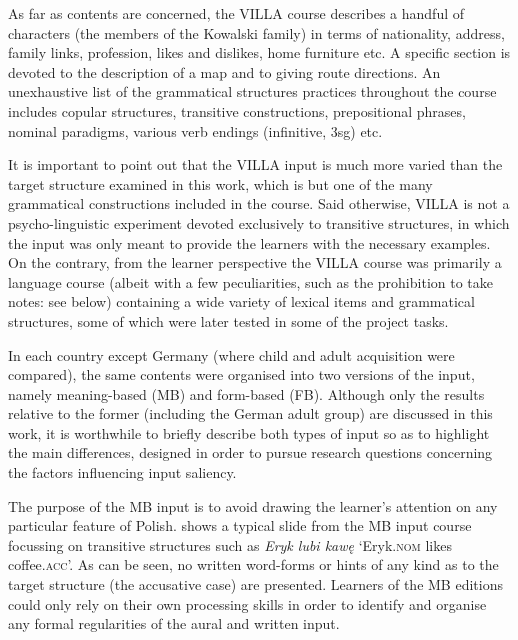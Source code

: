 As far as contents are concerned, the VILLA course describes a handful of characters (the members of the Kowalski family) in terms of nationality, address, family links, profession, likes and dislikes, home furniture etc. A specific section is devoted to the description of a map and to giving route directions. An unexhaustive list of the grammatical structures practices throughout the course includes copular structures, transitive constructions, prepositional phrases, nominal paradigms, various verb endings (infinitive, 3sg) etc.

It is important to point out that the VILLA input is much more varied than the target structure examined in this work, which is but one of the many grammatical constructions included in the course. Said otherwise, VILLA is not a psycho-linguistic experiment devoted exclusively to transitive structures, in which the input was only meant to provide the learners with the necessary examples. On the contrary, from the learner perspective the VILLA course was primarily a language course (albeit with a few peculiarities, such as the prohibition to take notes: see below) containing a wide variety of lexical items and grammatical structures, some of which were later tested in some of the project tasks.

In each country except Germany (where child and adult acquisition were compared), the same contents were organised into two versions of the input, namely meaning-based (MB) and form-based (FB). Although only the results relative to the former (including the German adult group) are discussed in this work, it is worthwhile to briefly describe both types of input so as to highlight the main differences, designed in order to pursue research questions concerning the factors influencing input saliency. 

The purpose of the MB input is to avoid drawing the learner’s attention on any particular feature of Polish.  shows a typical slide from the MB input course focussing on transitive structures such as \textit{Eryk lubi kawę} ‘Eryk.\textsc{nom} likes coffee.\textsc{acc}’. As can be seen, no written word-forms or hints of any kind as to the target structure (the accusative case) are presented. Learners of the MB editions could only rely on their own processing skills in order to identify and organise any formal regularities of the aural and written input.

